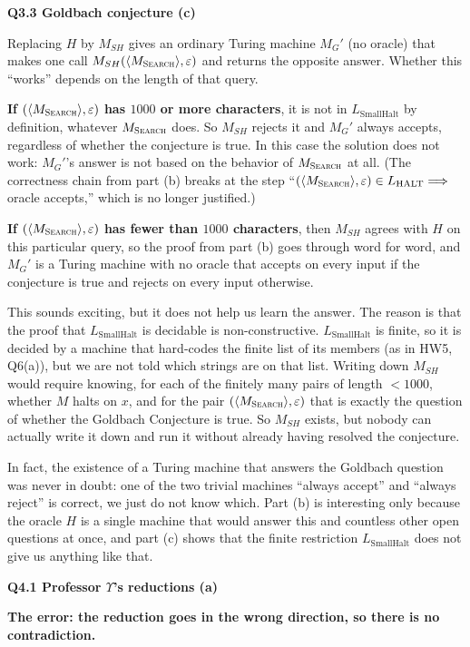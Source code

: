 \documentclass[11pt]{article}
\newcommand{\inner}[1]{\langle #1 \rangle}
\newcommand{\Lh}{L_{\text{HALT}}}
\newcommand{\Lsmh}{L_{\text{SmallHalt}}}
\newcommand{\Ms}{M_{\textsc{Search}}}
\newcommand{\qpage}[1]{\clearpage\noindent\textbf{\large #1}\par\medskip}
\begin{document}
\qpage{Q3.3 Goldbach conjecture (c)}

Replacing $H$ by $M_{SH}$ gives an ordinary Turing machine $M_G'$ (no oracle) that makes one call $M_{SH}(\inner{\Ms}, \varepsilon)$ and returns the opposite answer.
Whether this ``works'' depends on the length of that query.

\textbf{If $(\inner{\Ms}, \varepsilon)$ has $1000$ or more characters}, it is not in $\Lsmh$ by definition, whatever $\Ms$ does.
So $M_{SH}$ rejects it and $M_G'$ always accepts, regardless of whether the conjecture is true.
In this case the solution does not work: $M_G'$'s answer is not based on the behavior of $\Ms$ at all.
(The correctness chain from part (b) breaks at the step ``$(\inner{\Ms}, \varepsilon) \in \Lh \Longrightarrow$ oracle accepts,'' which is no longer justified.)

\textbf{If $(\inner{\Ms}, \varepsilon)$ has fewer than $1000$ characters}, then $M_{SH}$ agrees with $H$ on this particular query, so the proof from part (b) goes through word for word, and $M_G'$ is a Turing machine with no oracle that accepts on every input if the conjecture is true and rejects on every input otherwise.

This sounds exciting, but it does not help us learn the answer.
The reason is that the proof that $\Lsmh$ is decidable is non-constructive.
$\Lsmh$ is finite, so it is decided by a machine that hard-codes the finite list of its members (as in HW5, Q6(a)), but we are not told which strings are on that list.
Writing down $M_{SH}$ would require knowing, for each of the finitely many pairs of length $< 1000$, whether $M$ halts on $x$, and for the pair $(\inner{\Ms}, \varepsilon)$ that is exactly the question of whether the Goldbach Conjecture is true.
So $M_{SH}$ exists, but nobody can actually write it down and run it without already having resolved the conjecture.

In fact, the existence of a Turing machine that answers the Goldbach question was never in doubt: one of the two trivial machines ``always accept'' and ``always reject'' is correct, we just do not know which.
Part (b) is interesting only because the oracle $H$ is a single machine that would answer this and countless other open questions at once, and part (c) shows that the finite restriction $\Lsmh$ does not give us anything like that.

\qpage{Q4.1 Professor $\Upsilon$'s reductions (a)}

\textbf{The error: the reduction goes in the wrong direction, so there is no contradiction.}
\end{document}
